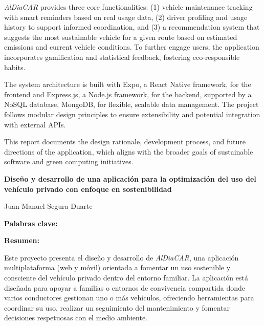 \textit{AlDiaCAR} provides three core functionalities: (1) vehicle maintenance tracking with smart reminders based on real usage data, (2) driver profiling and usage history to support informed coordination, and (3) a recommendation system that suggests the most sustainable vehicle for a given route based on estimated emissions and current vehicle conditions. To further engage users, the application incorporates gamification and statistical feedback, fostering eco-responsible habits.

\textgap

The system architecture is built with Expo, a React Native framework, for the frontend and Express.js, a Node.js framework, for the backend, supported by a NoSQL database, MongoDB, for flexible, scalable data management. The project follows modular design principles to ensure extensibility and potential integration with external APIs.

\textgap

This report documents the design rationale, development process, and future directions of the application, which aligns with the broader goals of sustainable software and green computing initiatives.


\clearpage
\thispagestyle{empty}
\mbox{}
\newpage


\thispagestyle{empty}
\begin{center}
    {\large\bfseries Diseño y desarrollo de una aplicación para la optimización del uso del vehículo privado con enfoque en sostenibilidad}
\end{center}
\begin{center}
    Juan Manuel Segura Duarte
\end{center}

\begin{flushleft}
    \textbf{Palabras clave:}
\end{flushleft}

\begin{flushleft}
    \textbf{Resumen:}
\end{flushleft}

Este proyecto presenta el diseño y desarrollo de \textit{AlDiaCAR}, una aplicación multiplataforma (web y móvil) orientada a fomentar un uso sostenible y consciente del vehículo privado dentro del entorno familiar. La aplicación está diseñada para apoyar a familias o entornos de convivencia compartida donde varios conductores gestionan uno o más vehículos, ofreciendo herramientas para coordinar su uso, realizar un seguimiento del mantenimiento y fomentar decisiones respetuosas con el medio ambiente.

